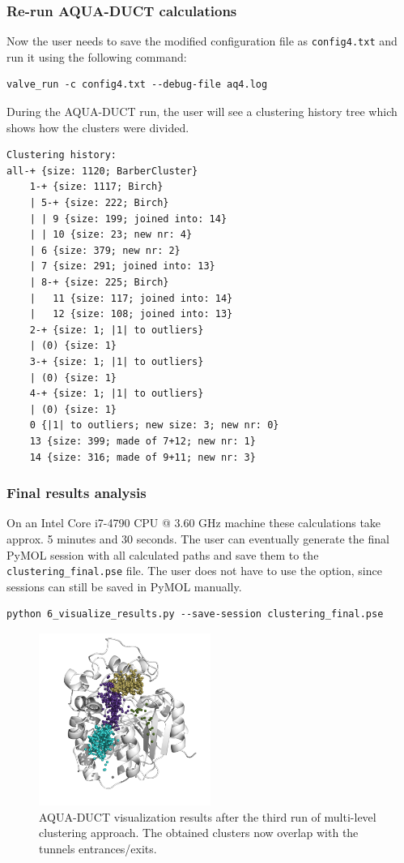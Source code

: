 \documentclass[9pt,tutorial]{livecoms}
\begin{document}
\subsubsection{Re-run AQUA-DUCT calculations}
Now the user needs to save the modified configuration file as \texttt{config4.txt} and run it using the following command:
\begin{lstlisting}[columns=fullflexible]
valve_run -c config4.txt --debug-file aq4.log
\end{lstlisting}
During the AQUA-DUCT run, the user will see a clustering history tree which shows how the clusters were divided.
\begin{lstlisting}
Clustering history:
all-+ {size: 1120; BarberCluster}
    1-+ {size: 1117; Birch}
    | 5-+ {size: 222; Birch}
    | | 9 {size: 199; joined into: 14}
    | | 10 {size: 23; new nr: 4}
    | 6 {size: 379; new nr: 2}
    | 7 {size: 291; joined into: 13}
    | 8-+ {size: 225; Birch}
    |   11 {size: 117; joined into: 14}
    |   12 {size: 108; joined into: 13}
    2-+ {size: 1; |1| to outliers}
    | (0) {size: 1}
    3-+ {size: 1; |1| to outliers}
    | (0) {size: 1}
    4-+ {size: 1; |1| to outliers}
    | (0) {size: 1}
    0 {|1| to outliers; new size: 3; new nr: 0}
    13 {size: 399; made of 7+12; new nr: 1}
    14 {size: 316; made of 9+11; new nr: 3}
\end{lstlisting}

\subsubsection{Final results analysis}
On an Intel Core i7-4790 CPU @ 3.60 GHz machine these calculations take approx. 5 minutes and 30 seconds. The user can eventually generate the final PyMOL session with all calculated paths and save them to the \texttt{clustering\_final.pse} file. The user does not have to use the option, since sessions can still be saved in PyMOL manually.
\begin{lstlisting}
python 6_visualize_results.py --save-session clustering_final.pse
\end{lstlisting}

\begin{figure}[ht!]
\centering
\includegraphics[width=0.5\textwidth]{Tut2.3.png}
\caption{AQUA-DUCT visualization results after the third run of multi-level clustering approach. The obtained clusters now overlap with the tunnels entrances/exits.}
\label{Tut2.3}
\end{figure}
\end{document}
